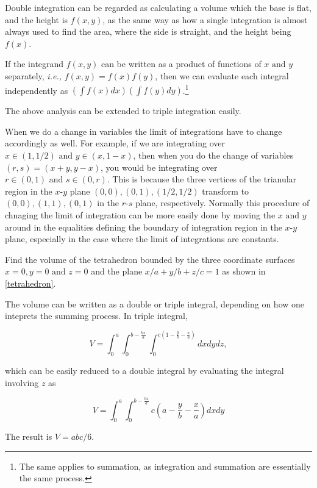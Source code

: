 \documentclass[english,a4paper,12pt]{report}
\begin{document}
Double integration can be regarded as calculating a volume which the base is flat, and the height is \(f(x,y)\), as the same way as how a single integration is almost always used to find the area, where the side is straight, and the height being \(f(x)\). 

If the integrand \(f(x,y)\) can be written as a product of functions of \(x \text { and } y\) separately, \textit{i.e.,} \(f(x,y) = f(x)f(y)\), then we can evaluate each integral independently as \(\left( \int f(x)dx \right)\left( \int f(y)dy \right)\).\footnote{The same applies to summation, as integration and summation are essentially the same process.} 

The above analysis can be extended to triple integration easily.

When we do a change in variables the limit of integrations have to change accordingly as well. For example, if we are integrating over \(x \in (1,1/2) \text { and } y \in (x,1-x)\), then when you do the change of variables \((r,s) = (x+y,y-x)\), you would be integrating over \(r \in (0,1) \text { and } s \in (0,r)\). This is because the three vertices of the trianular region in the \(x\)-\(y\) plane \((0,0),(0,1),(1/2,1/2)\) transform to \((0,0),(1,1),(0,1)\) in the \(r\)-\(s\) plane, respectively. Normally this procedure of chnaging the limit of integration can be more easily done by moving the \(x \text { and } y\) around in the equalities defining the boundary of integration region in the \(x\)-\(y\) plane, especially in the case where the limit of integrations are constants.   

{Find the volume of the tetrahedron bounded by the three coordinate surfaces \(x=0, y=0 \text { and }  z=0\) and the plane \(x/a + y /b + z /c =1\) as shown in \cref{tetrahedron}.}
{The volume can be written as a double or triple integral, depending on how one inteprets the summing process. In triple integral,

\begin{equation}
	V = \int_{0}^{a} \int_{0}^{b-\frac{bx}{a} } \int_{0}^{c\left(1-\frac{y}{b} - \frac{x}{a}  \right)} dxdydz,
\end{equation}

which can be easily reduced to a double integral by evaluating the integral involving \(z\) as

\begin{equation}
	V = \int_{0}^{a} \int_{0}^{b-\frac{bx}{a}}  c \left( a-\frac{y}{b} - \frac{x}{a}\right) dxdy
\end{equation}

The result is \(V = abc /6 \). } 
\end{document}
